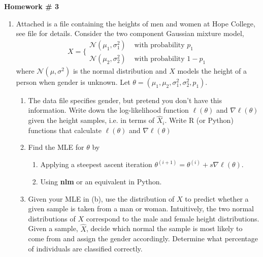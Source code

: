 \documentclass{article}
\begin{document}
\renewcommand{\a}{\textbf{a}}
\renewcommand{\b}{\textbf{b}}
\renewcommand{\d}{\textbf{d}}
\newcommand{\e}{\textbf{e}}

\large

\begin{center}
\textbf{Homework \# 3} \\  
\end{center}

\medskip


\medskip




\begin{enumerate} 


\item Attached is a file containing the heights of men and women at Hope College, see file for details.  Consider the two component Gaussian mixture model,
\begin{equation}
X = \bigg\{
\begin{array}{cc}
\mathcal{N}(\mu_1, \sigma_1^2) & \text{ with probability } p_1 \\
\mathcal{N}(\mu_2, \sigma_2^2) & \text{ with probability } 1 - p_1 
\end{array}
\end{equation}
where $\mathcal{N}(\mu, \sigma^2)$ is the normal distribution and $X$ models the height of a person when gender is unknown.  Let $\theta = (\mu_1, \mu_2, \sigma_1^2, \sigma_2^2, p_1)$.  
\begin{enumerate}
\item The data file specifies gender, but pretend you don't have this information.   Write down the log-likelihood function $\ell(\theta)$ and $\nabla \ell(\theta)$ given the height samples, i.e. in terms of $\hat{X}_i$.   Write R (or Python) functions that calculate $\ell(\theta)$ and $\nabla \ell(\theta)$
\item Find the MLE for $\theta$ by
\begin{enumerate}
\item Applying a steepest ascent iteration $\theta^{(i+1)} = \theta^{(i)} + s \nabla \ell(\theta)$.   
\item Using \textbf{nlm} or an equivalent in Python.
\end{enumerate}
\item Given your MLE in (b), use the distribution of $X$ to predict whether a given sample is taken from a man or woman.   Intuitively, the two normal distributions of $X$ correspond to the male and female height distributions.  Given a sample, $\hat{X}$, decide which normal the sample is most likely to come from and assign the gender accordingly.  Determine what percentage of individuals are classified correctly. 
\end{enumerate}


\end{enumerate}
\end{document}
